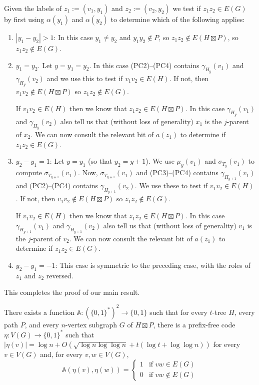 \documentclass[kpfonts]{patmorin}
\begin{document}
Given the labels of $z_1:=(v_1,y_1)$ and $z_2:=(v_2,y_2)$ we test if $z_1z_2\in E(G)$ by first using $\alpha(y_1)$ and $\alpha(y_2)$ to determine which of the following applies:
\begin{enumerate}
  \item $|y_1-y_2|>1$: In this case $y_1\neq y_2$ and $y_1y_2\not\in P$, so $z_1z_2\not\in E(H\boxtimes P)$, so $z_1z_2\not\in E(G)$.

  \item $y_1=y_2$.  Let $y=y_1=y_2$.  In this case (PC2)--(PC4) contains $\gamma_{H_y}(v_1)$ and $\gamma_{H_y}(v_2)$ and we use this to test if $v_1v_2\in E(H)$.  If not, then $v_1v_2\not\in E(H\boxtimes P)$ so $z_1z_2\not\in E(G)$.  
  
  If $v_1v_2\in E(H)$ then we know that $z_1z_2\in E(H\boxtimes P)$.  In this case $\gamma_{H_y}(v_1)$ and $\gamma_{H_y}(v_2)$ also tell us that (without loss of generality) $x_1$ is the $j$-parent of $x_2$.  We can now consult the relevant bit of $a(z_1)$ to determine if $z_1z_2\in E(G)$.

  \item $y_2-y_1=1$: Let $y=y_1$ (so that $y_2=y+1$).  We use $\mu_y(v_1)$ and $\sigma_{T_y}(v_1)$ to compute $\sigma_{T_{y+1}}(v_1)$.  Now, $\sigma_{T_{y+1}}(v_1)$ and (PC3)--(PC4) contains $\gamma_{H_{y+1}}(v_1)$ and (PC2)--(PC4) contains $\gamma_{H_{y+1}}(v_2)$.  We use these to test if $v_1v_2\in E(H)$.  If not, then $v_1v_2\not\in E(H\boxtimes P)$ so $z_1z_2\not\in E(G)$.  
  
  If $v_1v_2\in E(H)$ then we know that $z_1z_2\in E(H\boxtimes P)$.  In this case $\gamma_{H_{y+1}}(v_1)$ and $\gamma_{H_{y+1}}(v_2)$ also tell us that (without loss of generality) $v_1$ is the $j$-parent of $v_2$.  We can now consult the relevant bit of $a(z_1)$ to determine if $z_1z_2\in E(G)$.

  \item $y_2-y_1=-1$:  This case is symmetric to the preceding case, with the roles of $z_1$ and $z_2$ reversed.
\end{enumerate}

This completes the proof of our main result.

\begin{thm}
  There exists a function $\mathds{A}:(\{0,1\}^*)^2\to\{0,1\}$ such that for every $t$-tree $H$, every path $P$, and every $n$-vertex subgraph $G$ of $H\boxtimes P$, there is a prefix-free code $\eta:V(G)\to\{0,1\}^*$ such that
  $|\eta(v)|=\log n + O(\sqrt{\log n\log\log n}+t(\log t + \log\log n))$ for every $v\in V(G)$ and, for every $v,w\in V(G)$, 
  \[  \mathds{A}(\eta(v),\eta(w)) = \begin{cases}
        1 & \text{if $vw\in E(G)$} \\
        0 & \text{if $vw\not\in E(G)$}
      \end{cases}
      \]
\end{thm}
\end{document}
